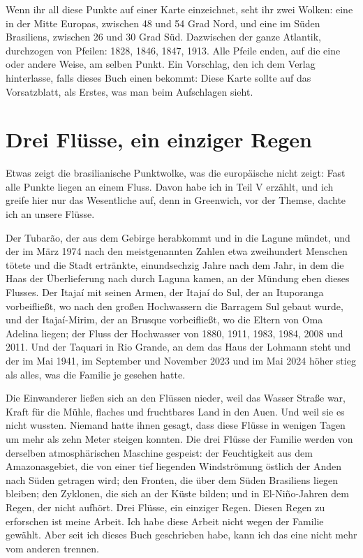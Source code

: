 \documentclass[
  ngerman,
  11pt,
  openany]{book}
\begin{document}
Wenn ihr all diese Punkte auf einer Karte einzeichnet, seht ihr zwei
Wolken: eine in der Mitte Europas, zwischen 48 und 54 Grad Nord, und
eine im Süden Brasiliens, zwischen 26 und 30 Grad Süd. Dazwischen der
ganze Atlantik, durchzogen von Pfeilen: 1828, 1846, 1847, 1913. Alle
Pfeile enden, auf die eine oder andere Weise, am selben Punkt. Ein
Vorschlag, den ich dem Verlag hinterlasse, falls dieses Buch einen
bekommt: Diese Karte sollte auf das Vorsatzblatt, als Erstes, was man
beim Aufschlagen sieht.

\section{Drei Flüsse, ein einziger
Regen}\label{drei-fluxfcsse-ein-einziger-regen}

Etwas zeigt die brasilianische Punktwolke, was die europäische nicht
zeigt: Fast alle Punkte liegen an einem Fluss. Davon habe ich in Teil V
erzählt, und ich greife hier nur das Wesentliche auf, denn in Greenwich,
vor der Themse, dachte ich an unsere Flüsse.

Der Tubarão, der aus dem Gebirge herabkommt und in die Lagune mündet,
und der im März 1974 nach den meistgenannten Zahlen etwa zweihundert
Menschen tötete und die Stadt ertränkte, einundsechzig Jahre nach dem
Jahr, in dem die Haas der Überlieferung nach durch Laguna kamen, an der
Mündung eben dieses Flusses. Der Itajaí mit seinen Armen, der Itajaí do
Sul, der an Ituporanga vorbeifließt, wo nach den großen Hochwassern die
Barragem Sul gebaut wurde, und der Itajaí-Mirim, der an Brusque
vorbeifließt, wo die Eltern von Oma Adelina liegen; der Fluss der
Hochwasser von 1880, 1911, 1983, 1984, 2008 und 2011. Und der Taquari in
Rio Grande, an dem das Haus der Lohmann steht und der im Mai 1941, im
September und November 2023 und im Mai 2024 höher stieg als alles, was
die Familie je gesehen hatte.

Die Einwanderer ließen sich an den Flüssen nieder, weil das Wasser
Straße war, Kraft für die Mühle, flaches und fruchtbares Land in den
Auen. Und weil sie es nicht wussten. Niemand hatte ihnen gesagt, dass
diese Flüsse in wenigen Tagen um mehr als zehn Meter steigen konnten.
Die drei Flüsse der Familie werden von derselben atmosphärischen
Maschine gespeist: der Feuchtigkeit aus dem Amazonasgebiet, die von
einer tief liegenden Windströmung östlich der Anden nach Süden getragen
wird; den Fronten, die über dem Süden Brasiliens liegen bleiben; den
Zyklonen, die sich an der Küste bilden; und in El-Niño-Jahren dem Regen,
der nicht aufhört. Drei Flüsse, ein einziger Regen. Diesen Regen zu
erforschen ist meine Arbeit. Ich habe diese Arbeit nicht wegen der
Familie gewählt. Aber seit ich dieses Buch geschrieben habe, kann ich
das eine nicht mehr vom anderen trennen.
\end{document}

